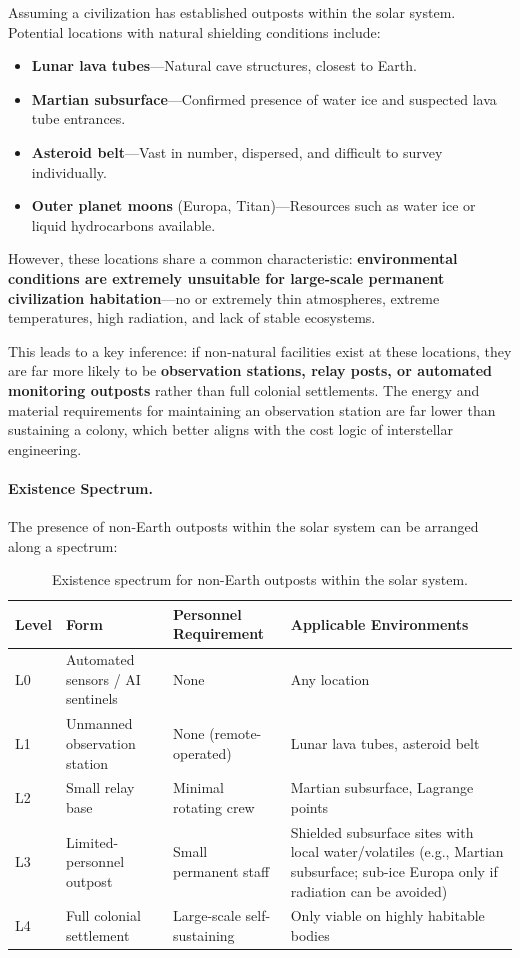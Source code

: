 \documentclass[aps,prd,twocolumn,superscriptaddress,nofootinbib]{revtex4-2}
\begin{document}
Assuming a civilization has established outposts within the solar system. Potential locations with natural shielding conditions include:

\begin{itemize}
  \item \textbf{Lunar lava tubes}---Natural cave structures, closest to Earth.
  \item \textbf{Martian subsurface}---Confirmed presence of water ice and suspected lava tube entrances.
  \item \textbf{Asteroid belt}---Vast in number, dispersed, and difficult to survey individually.
  \item \textbf{Outer planet moons} (Europa, Titan)---Resources such as water ice or liquid hydrocarbons available.
\end{itemize}

However, these locations share a common characteristic: \textbf{environmental conditions are extremely unsuitable for large-scale permanent civilization habitation}---no or extremely thin atmospheres, extreme temperatures, high radiation, and lack of stable ecosystems.

This leads to a key inference: if non-natural facilities exist at these locations, they are far more likely to be \textbf{observation stations, relay posts, or automated monitoring outposts} rather than full colonial settlements. The energy and material requirements for maintaining an observation station are far lower than sustaining a colony, which better aligns with the cost logic of interstellar engineering.

\paragraph{Existence Spectrum.}

The presence of non-Earth outposts within the solar system can be arranged along a spectrum:

\begin{table}[htbp]
\caption{Existence spectrum for non-Earth outposts within the solar system.}
\label{tab:existence-spectrum}
\footnotesize
\begin{tabular}{P{0.118\textwidth}P{0.223\textwidth}P{0.211\textwidth}P{0.320\textwidth}}
\toprule
Level & Form & Personnel Requirement & Applicable Environments \\
\midrule
L0 & Automated sensors / AI sentinels & None & Any location \\
L1 & Unmanned observation station & None (remote-operated) & Lunar lava tubes, asteroid belt \\
L2 & Small relay base & Minimal rotating crew & Martian subsurface, Lagrange points \\
L3 & Limited-personnel outpost & Small permanent staff & Shielded subsurface sites with local water/volatiles (e.g., Martian subsurface; sub-ice Europa only if radiation can be avoided) \\
L4 & Full colonial settlement & Large-scale self-sustaining & Only viable on highly habitable bodies \\
\bottomrule
\end{tabular}
\end{table}
\end{document}
